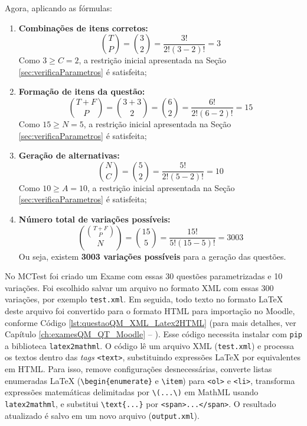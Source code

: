 Agora, aplicando as fórmulas:

\begin{enumerate}
    \item \textbf{Combinações de itens corretos:}
    \begin{equation}
        \binom{T}{P} = \binom{3}{2} = \frac{3!}{2!(3-2)!} = 3
    \end{equation}
    Como $3 \geq C =2$, a restrição inicial apresentada na Seção \ref{sec:verificaParametros} é satisfeita;

    \item \textbf{Formação de itens da questão:}
    \begin{equation}
        \binom{T+F}{P} = \binom{3+3}{2} = \binom{6}{2} = \frac{6!}{2!(6-2)!} = 15
    \end{equation}
    Como $15 \geq N =5$, a restrição inicial apresentada na Seção \ref{sec:verificaParametros} é satisfeita;

    \item \textbf{Geração de alternativas:}
    \begin{equation}
        \binom{N}{C} = \binom{5}{2} = \frac{5!}{2!(5-2)!} = 10
    \end{equation}
    Como $10 \geq A =10$, a restrição inicial apresentada na Seção \ref{sec:verificaParametros} é satisfeita;

    \item \textbf{Número total de variações possíveis:}
    \begin{equation}
        \binom{\binom{T+F}{P}}{N} = \binom{15}{5} = \frac{15!}{5!(15-5)!} = 3003
    \end{equation}
    Ou seja, existem \textbf{3003 variações possíveis} para a geração das questões.
\end{enumerate}


No MCTest foi criado um Exame com essas 30 questões parametrizadas e 10 variações. Foi escolhido salvar um arquivo no formato XML com essas 300 variações, por exemplo \verb|test.xml|. Em seguida, todo texto no formato \LaTeX{} deste arquivo foi convertido para o formato HTML para importação no Moodle, conforme Código \ref{lst:questaoQM_XML_Latex2HTML} (para mais detalhes, ver Capítulo \ref{ch:examesQM_QT_Moodle} -- ). Esse código necessita instalar com \verb|pip| a biblioteca \verb|latex2mathml|. O código lê um arquivo XML (\verb|test.xml|) e processa os textos dentro das \textit{tags} \verb|<text>|, substituindo expressões \LaTeX{} por equivalentes em HTML. Para isso, remove configurações desnecessárias, converte listas enumeradas \LaTeX{} (\verb|\begin{enumerate}| e \verb|\item|) para \verb|<ol>| e \verb|<li>|, transforma expressões matemáticas delimitadas por \verb|\(...\)| em MathML usando \verb|latex2mathml|, e substitui \verb|\text{...}| por \verb|<span>...</span>|. O resultado atualizado é salvo em um novo arquivo (\verb|output.xml|).

